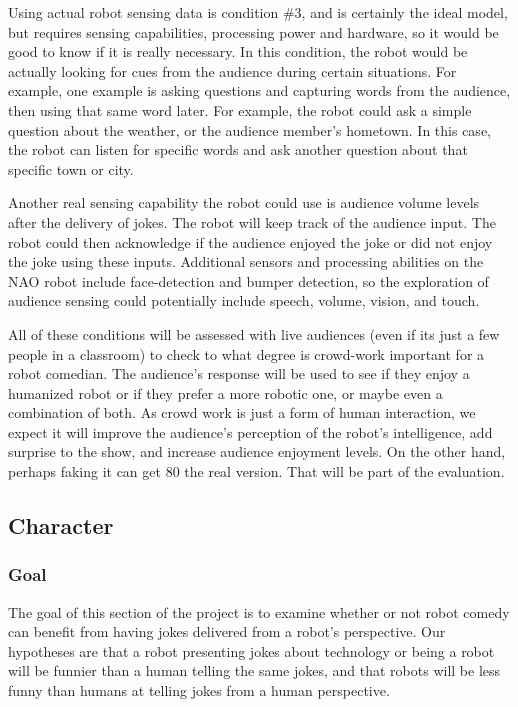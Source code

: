 \documentclass[onecolumn, draftclsnofoot,10pt, compsoc]{IEEEtran}
\begin{document}
Using actual robot sensing data is condition \#3, and is certainly the ideal model, but requires sensing capabilities,
processing power and hardware, so it would be good to know if it is really necessary. In this condition, the robot would
be actually looking for cues from the audience during certain situations. For example, one example is asking questions
and capturing words from the audience, then using that same word later. For example, the robot could ask a simple
question about the weather, or the audience member’s hometown. In this case, the robot can listen for specific words
and ask another question about that specific town or city.

Another real sensing capability the robot could use is audience volume levels after the delivery of jokes. The robot
will keep track of the audience input. The robot could then acknowledge if the audience enjoyed the joke or did not
enjoy the joke using these inputs. Additional sensors and processing abilities on the NAO robot include face-detection
and bumper detection, so the exploration of audience sensing could potentially include speech, volume, vision, and
touch.

All of these conditions will be assessed with live audiences (even if its just a few people in a classroom) to check to
what degree is crowd-work important for a robot comedian. The audience’s response will be used to see if they enjoy
a humanized robot or if they prefer a more robotic one, or maybe even a combination of both. As crowd work is just a
form of human interaction, we expect it will improve the audience’s perception of the robot’s intelligence, add surprise
to the show, and increase audience enjoyment levels. On the other hand, perhaps faking it can get 80%
the real version. That will be part of the evaluation.



\subsection{Character}
\subsubsection{Goal}
The goal of this section of the project is to examine whether or not robot comedy can benefit from having jokes delivered
from a robot’s perspective. Our hypotheses are that a robot presenting jokes about technology or being a robot will be
funnier than a human telling the same jokes, and that robots will be less funny than humans at telling jokes from a
human perspective.
\end{document}
